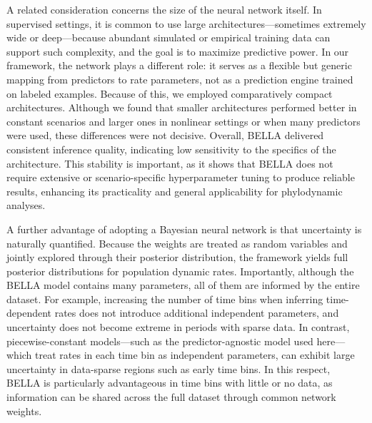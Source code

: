 A related consideration concerns the size of the neural network itself.
In supervised settings, it is common to use large architectures---sometimes extremely wide or deep---because abundant simulated or empirical training data can support such complexity, and the goal is to maximize predictive power.
In our framework, the network plays a different role: it serves as a flexible but generic mapping from predictors to rate parameters, not as a prediction engine trained on labeled examples. 
Because of this, we employed comparatively compact architectures. 
Although we found that smaller architectures performed better in constant scenarios and larger ones in nonlinear settings or when many predictors were used, these differences were not decisive.
Overall, BELLA delivered consistent inference quality, indicating low sensitivity to the specifics of the architecture.
This stability is important, as it shows that BELLA does not require extensive or scenario-specific hyperparameter tuning to produce reliable results, enhancing its practicality and general applicability for phylodynamic analyses.

A further advantage of adopting a Bayesian neural network is that uncertainty is naturally quantified.
Because the weights are treated as random variables and jointly explored through their posterior distribution, the framework yields full posterior distributions for population dynamic rates.
Importantly, although the BELLA model contains many parameters, all of them are informed by the entire dataset.
For example, increasing the number of time bins when inferring time-dependent rates does not introduce additional independent parameters, and uncertainty does not become extreme in periods with sparse data.
In contrast, piecewise-constant models---such as the predictor-agnostic model used here---which treat rates in each time bin as independent parameters, can exhibit large uncertainty in data-sparse regions such as early time bins.
In this respect, BELLA is particularly advantageous in time bins with little or no data, as information can be shared across the full dataset through common network weights.

